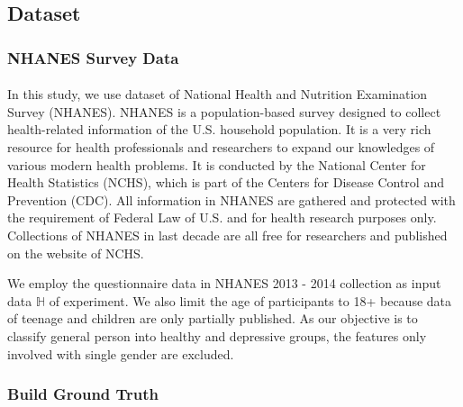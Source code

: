 \documentclass[runningheads]{llncs}
\begin{document}
\subsection{Dataset}
\subsubsection{NHANES Survey Data}
\paragraph{}
In this study, we use dataset of National Health and Nutrition Examination Survey (NHANES). NHANES is a population-based survey designed to collect health-related information of the U.S. household population. It is a very rich resource for health professionals and researchers to expand our knowledges of various modern health problems. It is conducted by the National Center for Health Statistics (NCHS), which is part of the Centers for Disease Control and Prevention (CDC). All information in NHANES are gathered and protected with the requirement of Federal Law of U.S. and for health research purposes only. Collections of NHANES in last decade are all free for researchers and published on the website of NCHS.

We employ the questionnaire data in NHANES 2013 - 2014 collection as input data $\mathbb{H}$ of experiment. We also limit the age of participants to 18+ because data of teenage and children are only partially published. As our objective is to classify general person into healthy and depressive groups, the features only involved with single gender are excluded.  
%
\subsubsection{Build Ground Truth}
\end{document}
